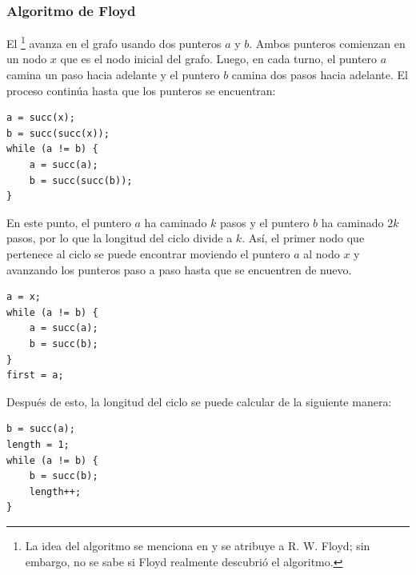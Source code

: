 \subsubsection{Algoritmo de Floyd}


El \footnote{La idea del algoritmo se menciona en \cite{knu982}
y se atribuye a R. W. Floyd; sin embargo, no se sabe si Floyd realmente
descubrió el algoritmo.} avanza
en el grafo usando dos punteros $a$ y $b$.
Ambos punteros comienzan en un nodo $x$ que
es el nodo inicial del grafo.
Luego, en cada turno, el puntero $a$ camina
un paso hacia adelante y el puntero $b$
camina dos pasos hacia adelante.
El proceso continúa hasta que
los punteros se encuentran:
\begin{lstlisting}
a = succ(x);
b = succ(succ(x));
while (a != b) {
    a = succ(a);
    b = succ(succ(b));
}
\end{lstlisting}

En este punto, el puntero $a$ ha caminado $k$ pasos
y el puntero $b$ ha caminado $2k$ pasos,
por lo que la longitud del ciclo divide a $k$.
Así, el primer nodo que pertenece al ciclo
se puede encontrar moviendo el puntero $a$ al nodo $x$
y avanzando los punteros
paso a paso hasta que se encuentren de nuevo.
\begin{lstlisting}
a = x;
while (a != b) {
    a = succ(a);
    b = succ(b);
}
first = a;
\end{lstlisting}

Después de esto, la longitud del ciclo
se puede calcular de la siguiente manera:
\begin{lstlisting}
b = succ(a);
length = 1;
while (a != b) {
    b = succ(b);
    length++;
}
\end{lstlisting}
